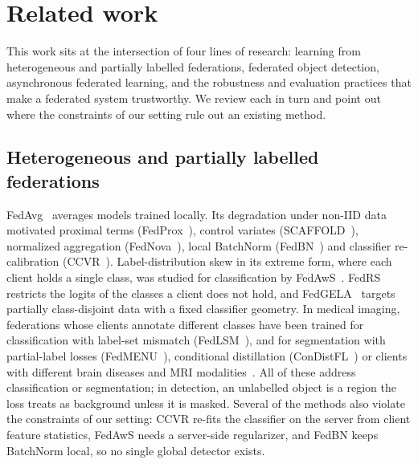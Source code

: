 \documentclass[pdflatex,sn-mathphys-num]{sn-jnl}
\begin{document}
\section{Related work}\label{sec:related}

This work sits at the intersection of four lines of research: learning from heterogeneous and partially labelled federations, federated object detection, asynchronous federated learning, and the robustness and evaluation practices that make a federated system trustworthy. We review each in turn and point out where the constraints of our setting rule out an existing method.

\subsection{Heterogeneous and partially labelled federations}
FedAvg~\cite{mcmahan2017fedavg} averages models trained locally. Its degradation under non-IID data motivated proximal terms (FedProx~\cite{li2020fedprox}), control variates (SCAFFOLD~\cite{karimireddy2020scaffold}), normalized aggregation (FedNova~\cite{wang2020fednova}), local BatchNorm (FedBN~\cite{li2021fedbn}) and classifier re-calibration (CCVR~\cite{luo2021ccvr}). Label-distribution skew in its extreme form, where each client holds a single class, was studied for classification by FedAwS~\cite{yu2020fedaws}. FedRS~\cite{li2021fedrs} restricts the logits of the classes a client does not hold, and FedGELA~\cite{fan2023fedgela} targets partially class-disjoint data with a fixed classifier geometry. In medical imaging, federations whose clients annotate different classes have been trained for classification with label-set mismatch (FedLSM~\cite{deng2023fedlsm}), and for segmentation with partial-label losses (FedMENU~\cite{xu2023fedmenu}), conditional distillation (ConDistFL~\cite{wang2024condistfl}) or clients with different brain diseases and MRI modalities~\cite{wagner2025feasibility}. All of these address classification or segmentation; in detection, an unlabelled object is a region the loss treats as background unless it is masked. Several of the methods also violate the constraints of our setting: CCVR re-fits the classifier on the server from client feature statistics, FedAwS needs a server-side regularizer, and FedBN keeps BatchNorm local, so no single global detector exists.
\end{document}
